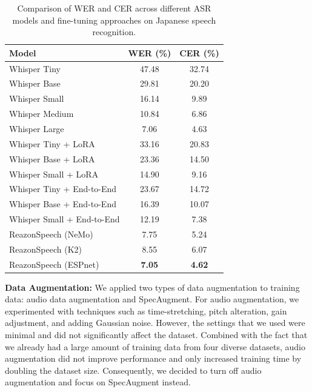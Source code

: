 \documentclass[10pt,twocolumn,letterpaper]{article}
\begin{document}
\begin{table}[t]
    \centering
    \begin{tabular}{lcc}
    \toprule
    \textbf{Model} & \textbf{WER (\%)} & \textbf{CER (\%)} \\
    \midrule
    Whisper Tiny & 47.48 & 32.74 \\
    Whisper Base & 29.81 & 20.20 \\
    Whisper Small & 16.14 & 9.89 \\
    Whisper Medium & 10.84 & 6.86 \\
    Whisper Large & 7.06 & 4.63 \\
    \midrule
    Whisper Tiny + LoRA & 33.16 & 20.83 \\
    Whisper Base + LoRA & 23.36 & 14.50 \\
    Whisper Small + LoRA & 14.90 & 9.16 \\
    \midrule
    Whisper Tiny + End-to-End & 23.67 & 14.72 \\
    Whisper Base + End-to-End & 16.39 & 10.07 \\
    Whisper Small + End-to-End & 12.19 & 7.38 \\
    \midrule
    ReazonSpeech (NeMo) & 7.75 & 5.24 \\
    ReazonSpeech (K2) & 8.55 & 6.07 \\
    ReazonSpeech (ESPnet) & \textbf{7.05} & \textbf{4.62} \\
    \bottomrule
    \end{tabular}
    \caption{Comparison of WER and CER across different ASR models and fine-tuning approaches on Japanese speech recognition.}
    \label{tab:asr_results}
\end{table}

\textbf{Data Augmentation:}
We applied two types of data augmentation to training data: audio data augmentation and SpecAugment.
For audio augmentation, we experimented with techniques such as time-stretching, pitch alteration, gain adjustment, and adding Gaussian noise. However, the settings that we used were minimal and did not significantly affect the dataset. Combined with the fact that we already had a large amount of training data from four diverse datasets, audio augmentation did not improve performance and only increased training time by doubling the dataset size. Consequently, we decided to turn off audio augmentation and focus on SpecAugment instead.
\end{document}
